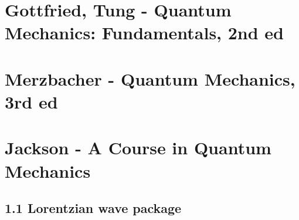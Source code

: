 \documentclass[10pt,a4paper]{book}
\theoremstyle{definition}
\begin{document}
\section{{\sc Gottfried, Tung} - Quantum Mechanics: Fundamentals, 2nd ed}

\section{{\sc Merzbacher} - Quantum Mechanics, 3rd ed}

\section{{\sc Jackson} - A Course in Quantum Mechanics}
\subsection{1.1 Lorentzian wave package}
\end{document}
